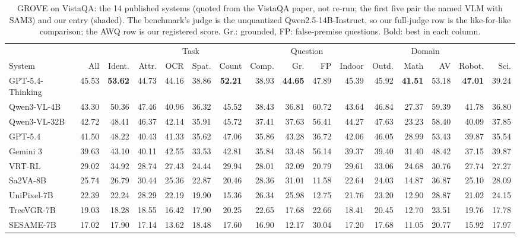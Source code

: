 \documentclass{article}
\begin{document}
\begin{table}[t]
\centering\scriptsize
\setlength{\tabcolsep}{2.2pt}
\caption{GROVE on VistaQA: the 14 published systems (quoted from the VistaQA paper, not re-run; the first five pair the named
VLM with SAM3) and our entry (shaded). The benchmark's judge is the unquantized Qwen2.5-14B-Instruct, so our full-judge row is
the like-for-like comparison; the AWQ row is our registered score. Gr.: grounded, FP: false-premise questions. Bold: best in each column.}
\label{tab:main}
\begin{tabular}{@{}lrrrrrrrrrrrrrrr@{}}
\toprule
 & & \multicolumn{6}{c}{Task} & \multicolumn{2}{c}{Question} & \multicolumn{6}{c}{Domain} \\
\cmidrule(lr){3-8}\cmidrule(lr){9-10}\cmidrule(l){11-16}
System & All & Ident. & Attr. & OCR & Spat. & Count & Comp. & Gr. & FP & Indoor & Outd. & Math & AV & Robot. & Sci. \\
\midrule
GPT-5.4-Thinking & 45.53 & \textbf{53.62} & 44.73 & 44.16 & 38.86 & \textbf{52.21} & 38.93 & \textbf{44.65} & 47.89 & 45.39 & 45.92 & \textbf{41.51} & 53.18 & \textbf{47.01} & 39.24 \\
Qwen3-VL-4B & 43.30 & 50.36 & 47.46 & 40.96 & 36.32 & 45.52 & 38.43 & 36.81 & 60.72 & 43.64 & 46.84 & 27.37 & 59.39 & 41.78 & 36.80 \\
Qwen3-VL-32B & 42.72 & 48.41 & 46.37 & 42.14 & 35.91 & 45.72 & 37.41 & 37.63 & 56.41 & 44.27 & 47.63 & 23.23 & 58.40 & 40.09 & 37.85 \\
GPT-5.4 & 41.50 & 48.22 & 40.43 & 41.33 & 35.62 & 47.06 & 35.86 & 43.28 & 36.72 & 42.06 & 46.05 & 28.99 & 53.43 & 39.87 & 35.54 \\
Gemini 3 & 39.63 & 43.10 & 40.11 & 42.55 & 33.53 & 42.81 & 35.84 & 33.48 & 56.14 & 39.37 & 39.40 & 31.40 & 48.42 & 37.15 & 39.87 \\
VRT-RL & 29.02 & 34.92 & 28.74 & 27.43 & 24.44 & 29.94 & 28.01 & 32.09 & 20.79 & 29.61 & 33.06 & 24.68 & 30.76 & 27.74 & 27.27 \\
Sa2VA-8B & 25.74 & 26.79 & 30.44 & 25.36 & 22.87 & 20.46 & 28.36 & 31.01 & 11.58 & 22.64 & 24.03 & 14.87 & 36.87 & 25.10 & 28.09 \\
UniPixel-7B & 22.39 & 22.24 & 28.29 & 22.19 & 19.90 & 15.36 & 26.34 & 25.98 & 12.75 & 21.76 & 23.20 & 12.90 & 28.87 & 21.02 & 24.15 \\
TreeVGR-7B & 19.03 & 18.28 & 18.55 & 16.42 & 17.90 & 20.25 & 22.65 & 17.68 & 22.66 & 18.41 & 20.45 & 12.70 & 23.51 & 19.76 & 17.78 \\
SESAME-7B & 17.02 & 17.90 & 17.14 & 13.62 & 18.48 & 17.60 & 16.90 & 12.17 & 30.04 & 17.20 & 17.68 & 11.05 & 20.77 & 15.92 & 17.97 \\

\end{tabular}
\end{table}
\end{document}

